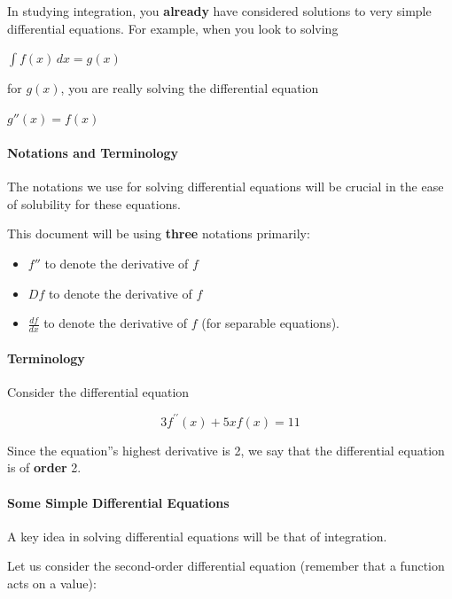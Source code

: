 In studying integration, you \textbf{already} have considered solutions to very simple differential equations. For example, when you look to solving

$\int f(x)\,dx = g(x)$

for $g(x)$, you are really solving the differential equation

$g''(x) = f(x) \,$



\paragraph{Notations and Terminology}

The notations we use for solving differential equations will be crucial in the ease of solubility for these equations.



This document will be using \textbf{three} notations primarily:

\begin{itemize}
    \item $f''$ to denote the derivative of $f$
    \item $D f$ to denote the derivative of $f$
    \item $\frac{df}{dx}$ to denote the derivative of $f$ (for separable equations).
\end{itemize}

\paragraph{Terminology}

Consider the differential equation

$$3 f^{\prime \prime}(x) + 5x f(x) = 11$$



Since the equation''s highest derivative is 2, we say that the differential equation is of \textbf{order} 2.



\paragraph{Some Simple Differential Equations}

A key idea in solving differential equations will be that of integration.



Let us consider the second-order differential equation (remember that a function acts on a value):

